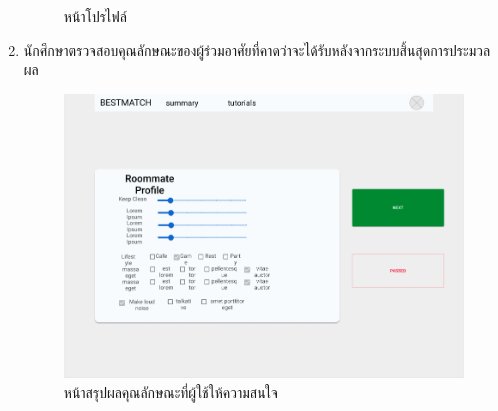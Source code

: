 \begin{enumerate}
\begin{figure}[h]
\begin{center}
          \end{center}
          \caption{หน้าโปรไฟล์}
          \label{fig:profile}
        \end{figure}
        \clearpage
  \item นักศึกษาตรวจสอบคุณลักษณะของผู้ร่วมอาศัยที่คาดว่าจะได้รับหลังจากระบบสิ้นสุดการประมวลผล
        \begin{figure}[h]
          \begin{center}
            \includegraphics[width=\linewidth]{photo/student/pick.png}
          \end{center}
          \caption{หน้าสรุปผลคุณลักษณะที่ผู้ใช้ให้ความสนใจ}
          \label{fig:summary}
        \end{figure}
        
        
        
        
        
        
        
\end{enumerate}


